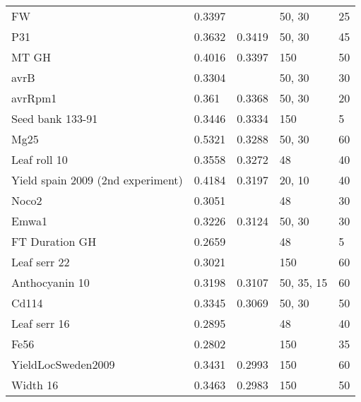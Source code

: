 \begin{longtable}{p{} p{} p{} p{} p{}}
  FW                                 & 0.3397  & \color{red}{0.3522}  & 50, 30       & 25     \\
  P31                                & 0.3632  & 0.3419               & 50, 30       & 45     \\
  MT GH                              & 0.4016  & 0.3397               & 150          & 50     \\
  avrB                               & 0.3304  & \color{red}{0.3384}  & 50, 30       & 30     \\
  avrRpm1                            & 0.361   & 0.3368               & 50, 30       & 20     \\
  Seed bank 133-91                   & 0.3446  & 0.3334               & 150          & 5      \\
  Mg25                               & 0.5321  & 0.3288               & 50, 30       & 60     \\
  Leaf roll 10                       & 0.3558  & 0.3272               & 48           & 40     \\
  Yield spain 2009 (2nd experiment)  & 0.4184  & 0.3197               & 20, 10       & 40     \\
  Noco2                              & 0.3051  & \color{red}{0.3174}  & 48           & 30     \\
  Emwa1                              & 0.3226  & 0.3124               & 50, 30       & 30     \\
  FT Duration GH                     & 0.2659  & \color{red}{0.3123}  & 48           & 5      \\
  Leaf serr 22                       & 0.3021  & \color{red}{0.3108}  & 150          & 60     \\
  Anthocyanin 10                     & 0.3198  & 0.3107               & 50, 35, 15   & 60     \\
  Cd114                              & 0.3345  & 0.3069               & 50, 30       & 50     \\
  Leaf serr 16                       & 0.2895  & \color{red}{0.3011}  & 48           & 40     \\
  Fe56                               & 0.2802  & \color{red}{0.3006}  & 150          & 35     \\
  YieldLocSweden2009                 & 0.3431  & 0.2993               & 150          & 60     \\
  Width 16                           & 0.3463  & 0.2983               & 150          & 50     \\

\end{longtable}

